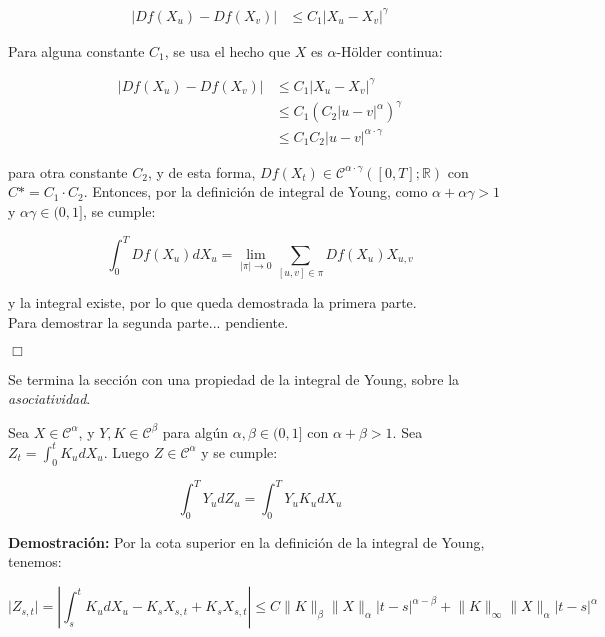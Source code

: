 \begin{align*}
	\lvert D f(X_u) - D f(X_v) \rvert &\leq C_1 \lvert X_u - X_v \rvert^{\gamma}
\end{align*}

Para alguna constante $C_1$, se usa el hecho que $X$ es $\alpha$-Hölder continua:

\begin{align*}
	\lvert D f(X_u) - D f(X_v) \rvert &\leq C_1 \lvert X_u - X_v \rvert^{\gamma} \\
	&\leq C_1 \left( C_2 \lvert u - v \rvert^{\alpha}  \right)^{\gamma} \\
	&\leq C_1 C_2 \lvert u - v \rvert^{\alpha \cdot \gamma}
\end{align*}

para otra constante $C_2$, y de esta forma, $D f(X_t) \in \mathcal{C}^{\alpha \cdot \gamma} ([0,T]; \mathbb{R})$ con $C* = C_1 \cdot C_2$. Entonces, por la definición de integral de Young, como $\alpha + \alpha \gamma > 1$ y $\alpha \gamma \in (0,1]$, se cumple:

\[
	\int_0^T Df(X_u) dX_u = \lim_{\lvert \pi \rvert \rightarrow 0} \sum_{ [u,v] \in \pi } Df(X_u) X_{u,v}
\]

y la integral existe, por lo que queda demostrada la primera parte. \\

Para demostrar la segunda parte... pendiente.

\begin{flushright}
	$\Box$
\end{flushright}

Se termina la sección con una propiedad de la integral de Young, sobre la \textit{asociatividad}.

\begin{lema}
	Sea $X \in \mathcal{C}^{\alpha}$, y $Y, K \in \mathcal{C}^{\beta}$ para algún $\alpha, \beta \in (0,1]$ con $\alpha + \beta > 1$. Sea $Z_t = \int_0^{t} K_u dX_u$. Luego $Z \in \mathcal{C}^{\alpha}$ y se cumple:

	\[
		\int_0^T Y_u dZ_u = \int_0^T Y_u K_u dX_u
	\]

\end{lema}

\textbf{Demostración:} Por la cota superior en la definición de la integral de Young, tenemos:

\[
	\lvert Z_{s,t} \rvert = \left\lvert \int_s^t K_u dX_u - K_s X_{s,t} + K_s X_{s,t} \right\rvert \leq C \lVert K \rVert_{\beta} \lVert X \rVert_{\alpha} \lvert t - s \rvert^{\alpha - \beta} + \lVert K \rVert_{\infty} \lVert X \rVert_{\alpha} \lvert t - s \rvert^{\alpha}
\]

